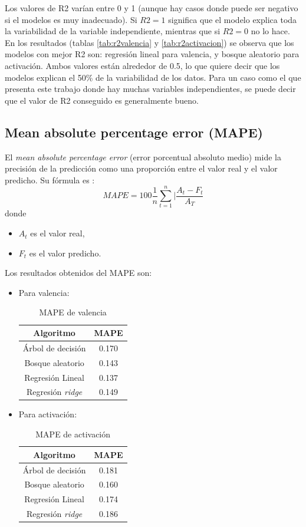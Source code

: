 \documentclass[12pt,a4paper,Spanish]{article}
\begin{document}
Los valores de R2 varían entre 0 y 1 (aunque hay casos donde puede ser negativo si el modelos es muy inadecuado). Si $R2 = 1$ significa que el modelo explica toda la variabilidad de la variable independiente, mientras que si $R2 = 0$ no lo hace. En los resultados (tablas \ref{tab:r2valencia} y \ref{tab:r2activacion}) se observa que los modelos con mejor R2 son: regresión lineal para valencia, y bosque aleatorio para activación. Ambos valores están alrededor de 0.5, lo que quiere decir que los modelos explican el 50\% de la variabilidad de los datos. Para un caso como el que presenta este trabajo donde hay muchas variables independientes, se puede decir que el valor de R2 conseguido es generalmente bueno.

\subsection{Mean absolute percentage error (MAPE)}\label{mape}
El \textit{mean absolute percentage error} (error porcentual absoluto medio) mide la precisión de la predicción como una proporción entre el valor real y el valor predicho. Su fórmula es \cite{enwiki:1225070385}:
\begin{equation}
	MAPE = 100 \frac{1}{n} \sum_{t=1}^{n} |\frac{A_t - F_t}{A_T} 
\end{equation}
donde
\begin{itemize}
	\item $A_t$ es el valor real,
	\item $F_t$ es el valor predicho.
\end{itemize}

Los resultados obtenidos del MAPE son:
\begin{itemize}
	\item Para valencia:
	\begin{table}[H]
		\centering
		\caption{MAPE de valencia}
		\label{tab:mapevalencia}
		\begin{tabular}{|c|c|}
			\hline
			\textbf{Algoritmo} & \textbf{MAPE} \\
			\hline
			Árbol de decisión & 0.170 \\
			Bosque aleatorio & 0.143 \\
			Regresión Lineal & 0.137 \\
			Regresión \textit{ridge} & 0.149 \\
			\hline
		\end{tabular}
	\end{table}
	\item Para activación:
	\begin{table}[H]
		\centering
		\caption{MAPE de activación}
		\label{tab:mapeactivacion}
		\begin{tabular}{|c|c|}
			\hline
			\textbf{Algoritmo} & \textbf{MAPE} \\
			\hline
			Árbol de decisión & 0.181 \\
			Bosque aleatorio & 0.160 \\
			Regresión Lineal & 0.174 \\
			Regresión \textit{ridge} & 0.186 \\
			\hline
		\end{tabular}
	\end{table}
\end{itemize}
\end{document}
